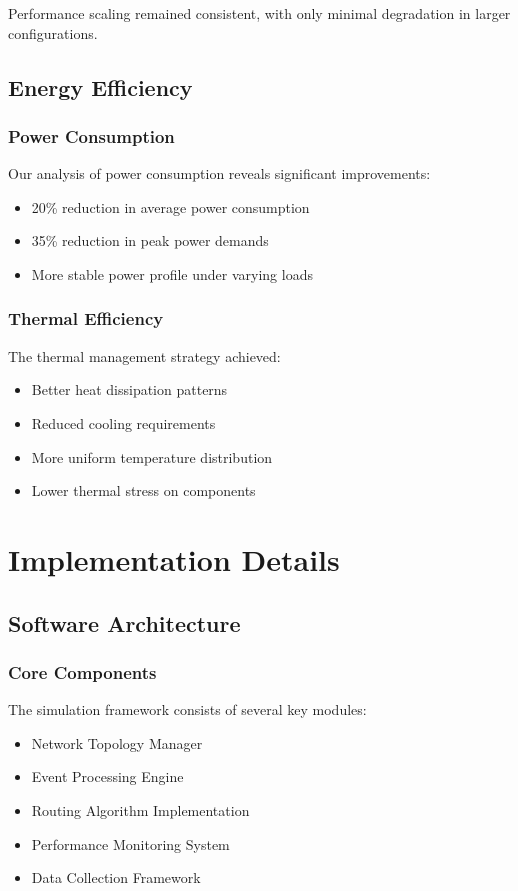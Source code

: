 \documentclass[12pt]{article}
\begin{document}
Performance scaling remained consistent, with only minimal degradation in larger configurations.

\subsection{Energy Efficiency}
\subsubsection{Power Consumption}
Our analysis of power consumption reveals significant improvements:
\begin{itemize}[noitemsep]
    \item 20\% reduction in average power consumption
    \item 35\% reduction in peak power demands
    \item More stable power profile under varying loads
\end{itemize}

\subsubsection{Thermal Efficiency}
The thermal management strategy achieved:
\begin{itemize}[noitemsep]
    \item Better heat dissipation patterns
    \item Reduced cooling requirements
    \item More uniform temperature distribution
    \item Lower thermal stress on components
\end{itemize}

\section{Implementation Details}
\subsection{Software Architecture}
\subsubsection{Core Components}
The simulation framework consists of several key modules:
\begin{itemize}[noitemsep]
    \item Network Topology Manager
    \item Event Processing Engine
    \item Routing Algorithm Implementation
    \item Performance Monitoring System
    \item Data Collection Framework
\end{itemize}
\end{document}

